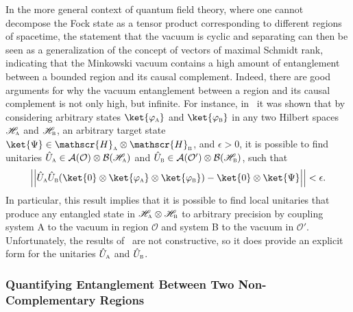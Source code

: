 \documentclass[letterpaper,12pt,titlepage,oneside,final]{book}
\newcommand{\tc}[1]{\textsc{#1}}
\begin{document}
In the more general context of quantum field theory, where one cannot decompose the Fock state as a tensor product corresponding to different regions of spacetime, the statement that the vacuum is cyclic and separating can then be seen as a generalization of the concept of vectors of maximal Schmidt rank, indicating that the Minkowski vacuum contains a high amount of entanglement between a bounded region and its causal complement. Indeed, there are good arguments for why the vacuum entanglement between a region and its causal complement is not only high, but infinite. For instance, in~\cite{universalEmbezzlers} it was shown that by considering arbitrary states $\ket{\varphi_\tc{a}}$ and $\ket{\varphi_\tc{b}}$ in any two Hilbert spaces $\mathscr{H}_\tc{a}$ and $\mathscr{H}_\tc{b}$, an arbitrary target state $\ket{\Psi}\in \mathscr{H}_\tc{a}\otimes\mathscr{H}_\tc{b}$, and $\epsilon>0$, it is possible to find unitaries $\hat{U}_\tc{a}\in \mathcal{A}(\mathcal{O})\otimes\mathcal{B}(\mathscr{H}_\tc{a})$ and  $\hat{U}_\tc{b}\in \mathcal{A}(\mathcal{O}')\otimes\mathcal{B}(\mathscr{H}_\tc{b})$, such that
\begin{equation}
    \left|\left|\hat{U}_\tc{a}\hat{U}_\tc{b}(\ket{0}\otimes \ket{\varphi_\tc{a}}\otimes \ket{\varphi_\tc{b}}) - \ket{0}\otimes \ket{\Psi}\right|\right| < \epsilon.
\end{equation}
In particular, this result implies that it is possible to find local unitaries that produce any entangled state in $\mathscr{H}_\tc{a}\otimes\mathscr{H}_\tc{b}$ to arbitrary precision by coupling system A to the vacuum in region $\mathcal{O}$ and system B to the vacuum in $\mathcal{O}'$. Unfortunately, the results of~\cite{universalEmbezzlers} are not constructive, so it does provide an explicit form for the unitaries $\hat{U}_\tc{a}$ and $\hat{U}_\tc{b}$.

\subsubsection*{Quantifying Entanglement Between Two {Non-Complementary} Regions}
\end{document}
